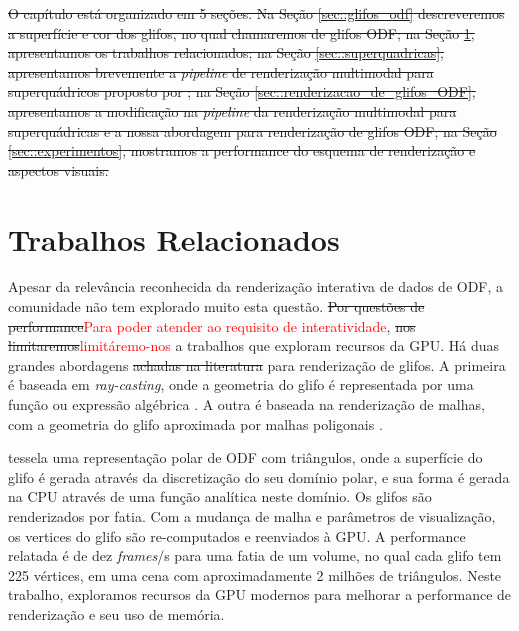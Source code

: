 \documentclass[
    12pt,                %
    oneside,            %
    a4paper,            %
    english,            %
    french,                %
    spanish,            %
    brazil                %
    ]{abntex2}
\begin{document}
\sout{O capítulo está organizado em 5 seções. Na Seção \ref{sec::glifos_odf} descreveremos a superfície e cor dos glifos, no qual chamaremos de glifos ODF; na Seção \ref{sec::trabalhos_relacionados}, apresentamos os trabalhos relacionados; na Seção \ref{sec::superquadricas}, apresentamos brevemente a \textit{pipeline} de renderização multimodal para superquádricos proposto por ; na Seção \ref{sec::renderizacao_de_glifos_ODF}, apresentamos a modificação na \textit{pipeline} da renderização multimodal para superquádricas e a nossa abordagem para renderização de glifos ODF; na Seção \ref{sec::experimentos}, mostramos a performance do esquema de renderização e aspectos visuais.}



\section{Trabalhos Relacionados}
\label{sec::trabalhos_relacionados}

Apesar da relevância reconhecida da renderização interativa de dados de ODF, a comunidade não tem explorado muito esta questão. \sout{Por questões de performance}\textcolor{red}{Para poder atender ao requisito de interatividade}, \sout{nos limitaremos}\textcolor{red}{limitáremo-nos} a trabalhos que exploram recursos da GPU. Há duas grandes abordagens \sout{achadas na literatura} para renderização de glifos. A primeira é baseada em \textit{ray-casting}, onde a geometria do glifo é representada por uma função ou expressão algébrica \cite{peeters2009, almsick2011}. A outra é baseada na renderização de malhas, com a geometria do glifo aproximada por malhas poligonais \cite{shattuck2008}.


 tessela uma representação polar de ODF com triângulos, onde a superfície do glifo é gerada através da discretização do seu domínio polar, e sua forma é gerada na CPU através de uma função analítica neste domínio. Os glifos são renderizados por fatia. Com a mudança de malha e parâmetros de visualização, os vertices do glifo são re-computados e reenviados à GPU. A performance relatada é de dez \textit{frames}/s para uma fatia de um volume, no qual cada glifo tem 225 vértices, em uma cena com aproximadamente 2 milhões de triângulos. Neste trabalho, exploramos recursos da GPU modernos para melhorar a performance de renderização e seu uso de memória.
\end{document}
